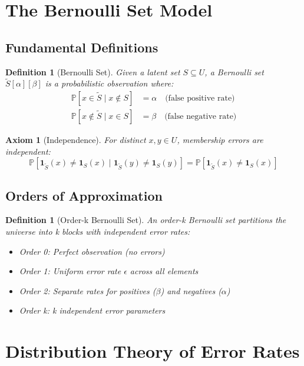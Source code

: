 \documentclass[11pt,final,hidelinks]{article}
\newtheorem{definition}[theorem]{Definition}
\newtheorem{axiom}{Axiom}
\newcommand{\obs}[1]{\widetilde{#1}}
\newcommand{\fprate}{\alpha}
\newcommand{\fnrate}{\beta}
\newcommand{\Prob}[1]{\mathbb{P}\left[#1\right]}
\newcommand{\ProbCond}[2]{\mathbb{P}\left[#1 \mid #2\right]}
\newcommand{\Indicator}[1]{\mathbf{1}_{#1}}
\begin{document}
\section{The Bernoulli Set Model}

\subsection{Fundamental Definitions}

\begin{definition}[Bernoulli Set]
Given a latent set $S \subseteq U$, a Bernoulli set $\obs{S}[\fprate][\fnrate]$ is a probabilistic observation where:
\begin{align}
\ProbCond{x \in \obs{S}}{x \notin S} &= \fprate \quad \text{(false positive rate)} \\
\ProbCond{x \notin \obs{S}}{x \in S} &= \fnrate \quad \text{(false negative rate)}
\end{align}
\end{definition}

\begin{axiom}[Independence]
For distinct $x, y \in U$, membership errors are independent:
\begin{equation}
\ProbCond{\Indicator{\obs{S}}(x) \neq \Indicator{S}(x)}{\Indicator{\obs{S}}(y) \neq \Indicator{S}(y)} = 
\Prob{\Indicator{\obs{S}}(x) \neq \Indicator{S}(x)}
\end{equation}
\end{axiom}

\subsection{Orders of Approximation}

\begin{definition}[Order-k Bernoulli Set]
An order-k Bernoulli set partitions the universe into k blocks with independent error rates:
\begin{itemize}
\item Order 0: Perfect observation (no errors)
\item Order 1: Uniform error rate $\epsilon$ across all elements
\item Order 2: Separate rates for positives ($\fnrate$) and negatives ($\fprate$)
\item Order k: k independent error parameters
\end{itemize}
\end{definition}

\section{Distribution Theory of Error Rates}
\end{document}
